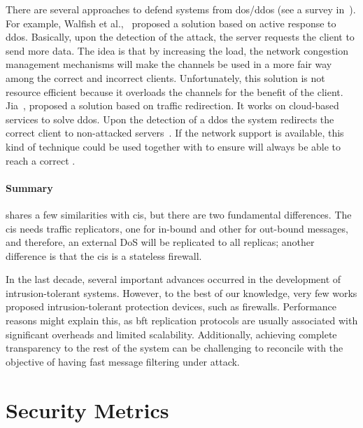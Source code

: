 There are several approaches to defend systems from \gls{dos}/\gls{ddos} (see a survey in~\cite{Zargar:2013}).
For example, Walfish et al.,~\cite{Walfish:2010} proposed a solution based on active response to \gls{ddos}. 
Basically, upon the detection of the attack, the server requests the client to send more data. 
The idea is that by increasing the load, the network congestion management mechanisms will make the channels be used in a more fair way among the correct and incorrect clients. 
Unfortunately, this solution is not resource efficient because it overloads the channels for the benefit of the client.
Jia~\etal{}, proposed a solution based on traffic redirection. It works on cloud-based services to solve \gls{ddos}.
Upon the detection of a \gls{ddos} the system redirects the correct client to non-attacked servers~\cite{Jia:2014}.
If the network support is available, this kind of technique could be used together with \sieveq to ensure \senders will always be able to reach a correct \presieve.

\paragraph{Summary}
\sieveq shares a few similarities with \gls{cis}, but there are two fundamental differences. 
The \gls{cis} needs traffic replicators, one for in-bound and other for out-bound messages, and therefore, an external DoS will be replicated to all replicas; another difference is that the \gls{cis} is a stateless firewall.


In the last decade, several important advances occurred in the development of intrusion-tolerant systems.
However, to the best of our knowledge, very few works proposed intrusion-tolerant protection devices, such as firewalls.
Performance reasons might explain this, as \gls{bft} replication protocols are usually associated with significant overheads and limited scalability.
Additionally, achieving complete transparency to the rest of the system can be challenging to reconcile with the objective of having fast message filtering under attack.



\section{Security Metrics}
\label{sec:securitymetrics}

